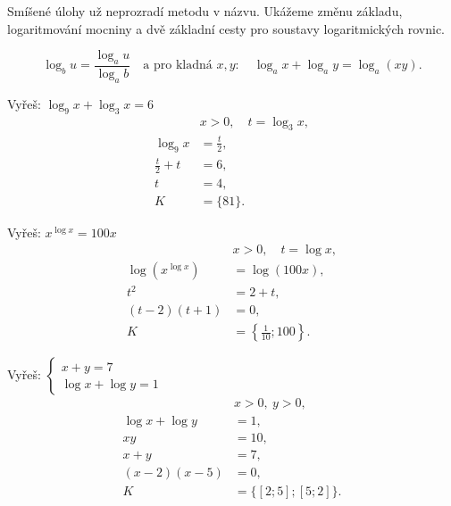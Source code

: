\documentclass[11pt,a4paper]{article}
\begin{document}
Smíšené úlohy už neprozradí metodu v názvu. Ukážeme změnu základu, logaritmování mocniny a dvě základní cesty pro soustavy logaritmických rovnic.

\[
\log_b u=\frac{\log_a u}{\log_a b}\quad\text{a pro kladná }x,y:\quad\log_a x+\log_a y=\log_a(xy).
\]


\begin{prikladReseniBox}[title={Příklad 1}]
Vyřeš: $\displaystyle \log_9 x+\log_3 x=6$
\tcblower
\[
\begin{aligned}
&x>0,\quad t=\log_3x,\\
\log_9x&=\frac{t}{2},\\
\frac{t}{2}+t&=6,\\
t&=4,\\
K&=\{81\}.
\end{aligned}
\]
\end{prikladReseniBox}
\begin{prikladReseniBox}[title={Příklad 2}]
Vyřeš: $\displaystyle x^{\log x}=100x$
\tcblower
\[
\begin{aligned}
&x>0,\quad t=\log x,\\
\log\!\left(x^{\log x}\right)&=\log(100x),\\
t^2&=2+t,\\
(t-2)(t+1)&=0,\\
K&=\left\{\frac1{10};100\right\}.
\end{aligned}
\]
\end{prikladReseniBox}
\begin{prikladReseniBox}[title={Příklad 3}]
Vyřeš: $\displaystyle \begin{cases}x+y=7\\ \log x+\log y=1\end{cases}$
\tcblower
\[
\begin{aligned}
&x>0,\ y>0,\\
\log x+\log y&=1,\\
xy&=10,\\
x+y&=7,\\
(x-2)(x-5)&=0,\\
K&=\{[2;5];[5;2]\}.
\end{aligned}
\]
\end{prikladReseniBox}
\end{document}
